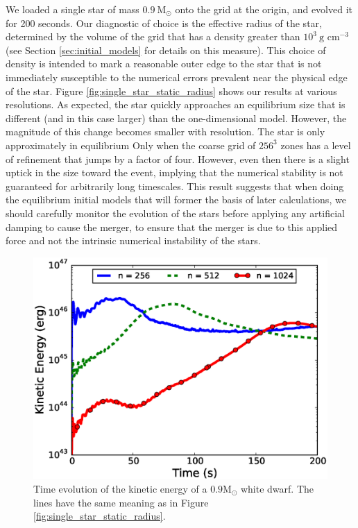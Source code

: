 \documentclass[iop]{emulateapj}
\newcommand{\msolar}{\mathrm{M}_\odot}
\begin{document}
We loaded a single star of mass $0.9\ \msolar$ onto the grid at the origin, 
and evolved it for 200 seconds. Our diagnostic of choice is the effective 
radius of the star, determined by the volume of the grid that has a density 
greater than $10^3\ \text{g cm}^{-3}$ (see Section \ref{sec:initial_models} 
for details on this measure). This choice of density is intended to 
mark a reasonable outer edge to the star that is not immediately susceptible 
to the numerical errors prevalent near the physical edge of the star. Figure 
\ref{fig:single_star_static_radius} shows our results at various resolutions. 
As expected, the star quickly approaches an equilibrium size that is different 
(and in this case larger) than the one-dimensional model. However, the magnitude 
of this change becomes smaller with resolution. The star is only approximately 
in equilibrium Only when the coarse grid of $256^3$ zones has a level of 
refinement that jumps by a factor of four. However, even then there is a slight 
uptick in the size toward the event, implying that the numerical stability 
is not guaranteed for arbitrarily long timescales. This result suggests that when 
doing the equilibrium initial models that will former the basis of later calculations,
we should carefully monitor the evolution of the stars before applying any 
artificial damping to cause the merger, to ensure that the merger is due to 
this applied force and not the intrinsic numerical instability of the stars.

\begin{figure}
  \centering
  \includegraphics[scale=0.45]{plots/single_star_static_ke}
  \caption{Time evolution of the kinetic energy of a $0.9 \msolar$ 
    white dwarf. The lines have the same meaning as in Figure \ref{fig:single_star_static_radius}.
    \label{fig:single_star_static_ke}}
\end{figure}
\end{document}
